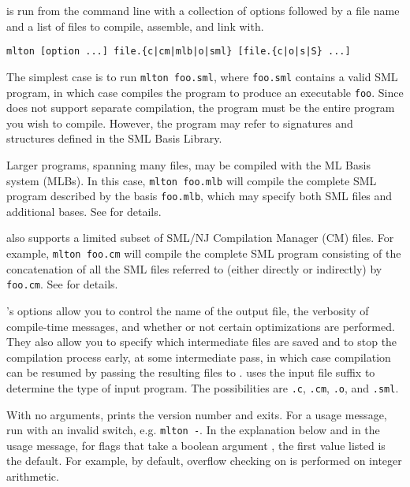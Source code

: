 %
{\mlton} is run from the command line with a collection of options
followed by a file name and a list of files to compile, assemble, and
link with.
\begin{verbatim}
mlton [option ...] file.{c|cm|mlb|o|sml} [file.{c|o|s|S} ...]
\end{verbatim}
The simplest case is to run {\tt mlton foo.sml}, where {\tt foo.sml}
contains a valid SML program, in which case {\mlton} compiles the
program to produce an executable {\tt foo}.  Since {\mlton} does not
support separate compilation, the program must be the entire
program you wish to compile.  However, the program may refer to
signatures and structures defined in the SML Basis Library.

Larger programs, spanning many files, may be compiled with the ML
Basis system (MLBs).  In this case, {\tt mlton foo.mlb} will compile
the complete SML program described by the basis {\tt foo.mlb}, which
may specify both SML files and additional bases.  See  for
details.

{\mlton} also supports a limited subset of SML/NJ Compilation Manager
(CM) files.  For example, {\tt mlton foo.cm} will compile the complete
SML program consisting of the concatenation of all the SML files
referred to (either directly or indirectly) by {\tt foo.cm}.  See
 for details.
%

{\mlton}'s options allow you to control the name of the output file,
the verbosity of compile-time messages, and whether or not certain
optimizations are performed.  They also allow you to specify which
intermediate files are saved and to stop the compilation process
early, at some intermediate pass, in which case compilation can be
resumed by passing the resulting files to {\mlton}.  {\mlton} uses the
input file suffix to determine the type of input program.  The
possibilities are {\tt .c}, {\tt .cm}, {\tt .o}, and {\tt .sml}.

With no arguments, {\mlton} prints the version number and exits.  For
a usage message, run {\mlton} with an invalid switch, e.g. {\tt mlton
-}.  In the explanation below and in the usage message, for flags
that take a boolean argument {\tt \trueFalse}, the first value
listed is the default.  For example, by default, overflow checking on
is performed on integer arithmetic.

